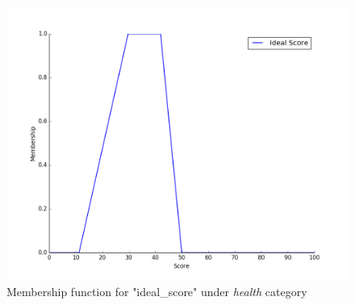\documentclass[conference]{IEEEtran}
\begin{document}
\begin{figure}[h!]
\centering
\captionsetup{justification=centering}
\noindent \includegraphics[scale=0.35]{ideal_health}
\caption{Membership function for "ideal\_score" under \textit{health} category}
\end{figure}
\end{document}

